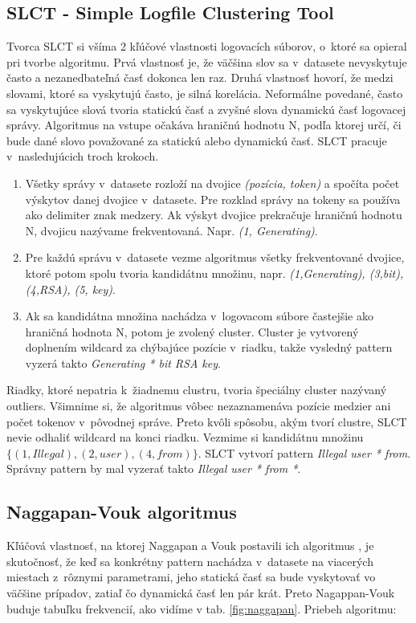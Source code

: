 \subsection{SLCT - Simple Logfile Clustering Tool}
Tvorca SLCT \parencite{slct, slctloghound} si všíma 2 kľúčové vlastnosti logovacích súborov, o~ktoré sa opieral pri tvorbe algoritmu. Prvá vlastnosť je, že väčšina slov sa v~datasete nevyskytuje často a nezanedbateľná časť dokonca len raz. Druhá vlastnosť hovorí, že medzi slovami, ktoré sa vyskytujú často, je silná korelácia. Neformálne povedané, často sa vyskytujúce slová tvoria statickú časť a zvyšné slova dynamickú časť logovacej správy. Algoritmus na vstupe očakáva hraničnú hodnotu N, podľa ktorej určí, či bude dané slovo považované za statickú alebo dynamickú časť.  SLCT pracuje v~nasledujúcich troch krokoch.

\begin{enumerate}
  \item Všetky správy v~datasete rozloží na dvojice \emph{(pozícia, token)} a spočíta počet výskytov danej dvojice v~datasete. Pre rozklad správy na tokeny sa používa ako delimiter znak medzery. Ak výskyt dvojice prekračuje hraničnú hodnotu N, dvojicu nazývame frekventovaná. Napr. \emph{(1, Generating)}.
  \item Pre každú správu v~datasete vezme algoritmus všetky frekventované dvojice, ktoré potom spolu tvoria kandidátnu množinu, napr. \emph{{(1,Generating), (3,bit), (4,RSA), (5, key)}}. 
  \item Ak sa kandidátna množina nachádza v~logovacom súbore častejšie ako hraničná hodnota N, potom je zvolený cluster. Cluster je vytvorený doplnením wildcard za chýbajúce pozície v~riadku, takže vysledný pattern vyzerá takto \emph{Generating * bit RSA key}.
\end{enumerate}

Riadky, ktoré nepatria k~žiadnemu clustru, tvoria špeciálny cluster nazývaný outliers. Všimnime si, že algoritmus vôbec nezaznamenáva pozície medzier ani počet tokenov v~pôvodnej správe. Preto kvôli spôsobu, akým tvorí clustre, SLCT nevie odhaliť wildcard na konci riadku. Vezmime si kandidátnu množinu $\{(1,Illegal), (2,user), (4,from)\} $. SLCT vytvorí pattern \emph{Illegal user * from}. Správny pattern by mal vyzerať takto  \emph{Illegal user * from *}.

\subsection{Naggapan-Vouk algoritmus}
Kľúčová vlastnosť, na ktorej Naggapan a Vouk postavili ich algoritmus \parencite{nagappanvouk}, je skutočnosť, že keď sa konkrétny pattern nachádza v~datasete na viacerých miestach z~rôznymi parametrami, jeho statická časť sa bude vyskytovať vo väčšine prípadov, zatiaľ čo dynamická časť len pár krát. Preto Nagappan-Vouk buduje tabuľku frekvencií, ako vidíme v tab. \ref{fig:naggapan}. Priebeh algoritmu:

